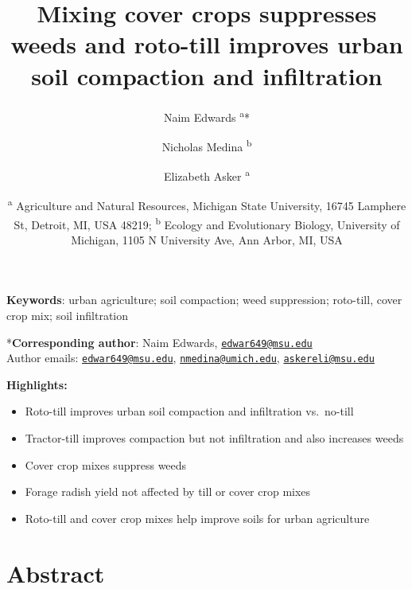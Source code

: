 \documentclass[
  12pt,
]{article}
\title{Mixing cover crops suppresses weeds and roto-till improves urban soil compaction and infiltration}
\author{Naim Edwards \textsuperscript{a}* \and Nicholas Medina \textsuperscript{b} \and Elizabeth Asker \textsuperscript{a}}
\date{\scriptsize \textsuperscript{a} Agriculture and Natural Resources, Michigan State University, 16745 Lamphere St, Detroit, MI, USA 48219; \textsuperscript{b} Ecology and Evolutionary Biology, University of Michigan, 1105 N University Ave, Ann Arbor, MI, USA}
\begin{document}
\maketitle

\hfill\break
\hfill\break

\textbf{Keywords}: urban agriculture; soil compaction; weed suppression; roto-till, cover crop mix; soil infiltration

\hfill\break
\hfill\break

*\textbf{Corresponding author}: Naim Edwards, \href{mailto:edwar649@msu.edu}{\nolinkurl{edwar649@msu.edu}}\\
Author emails: \href{mailto:edwar649@msu.edu}{\nolinkurl{edwar649@msu.edu}}, \href{mailto:nmedina@umich.edu}{\nolinkurl{nmedina@umich.edu}}, \href{mailto:askereli@msu.edu}{\nolinkurl{askereli@msu.edu}}

\newpage

\textbf{Highlights:}

\begin{itemize}
\item
  Roto-till improves urban soil compaction and infiltration vs.~no-till
\item
  Tractor-till improves compaction but not infiltration and also increases weeds
\item
  Cover crop mixes suppress weeds
\item
  Forage radish yield not affected by till or cover crop mixes
\item
  Roto-till and cover crop mixes help improve soils for urban agriculture
\end{itemize}

\newpage

\hypertarget{abstract}{%
\section*{Abstract}\label{abstract}}
\end{document}
